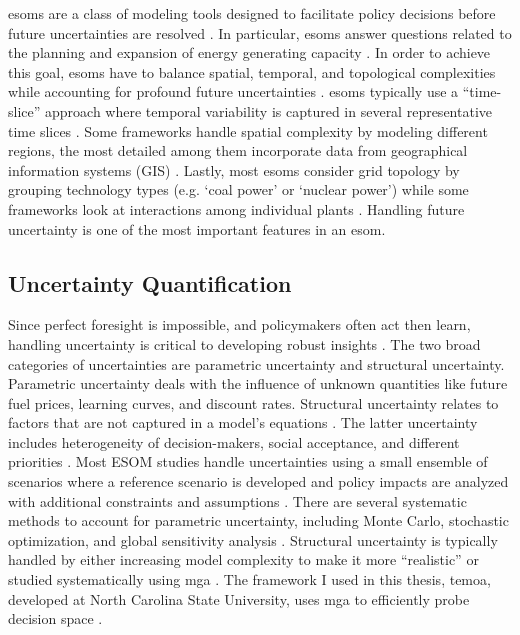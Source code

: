 \glspl{esom} are a class of modeling tools designed to facilitate policy decisions before
future uncertainties are resolved \cite{hunter_modeling_2013}. In particular, \glspl{esom} answer questions
related to the planning and expansion of energy generating capacity \cite{de_queiroz_repurposing_2019}.
In order to achieve this goal, \glspl{esom} have to balance spatial, temporal, and topological
complexities while accounting for profound future uncertainties \cite{martinez-gordon_review_2021}.
\glspl{esom} typically use a “time-slice” approach where temporal variability is captured in
several representative time slices \cite{fattahi_systemic_2020}. Some frameworks
handle spatial complexity by modeling different regions, the most detailed among
them incorporate data from geographical information systems (GIS) \cite{fattahi_systemic_2020}.
Lastly, most \glspl{esom} consider grid topology by grouping technology types (e.g. ‘coal power’
or ‘nuclear power’) \cite{fattahi_systemic_2020} while some frameworks look at
interactions among individual plants \cite{jenkins_enhanced_2017}. Handling
future uncertainty is one of the most important features in an \gls{esom}.

\subsection{Uncertainty Quantification}

Since perfect foresight is impossible, and policymakers often act then learn, handling
uncertainty is critical to developing robust insights
\cite{yue_review_2018, decarolis_modelling_2016}.
The two broad categories of uncertainties are parametric uncertainty and structural
uncertainty. Parametric uncertainty deals with the influence of unknown quantities
like future fuel prices, learning curves, and discount rates. Structural uncertainty
relates to factors that are not captured in a model’s equations
\cite{hunter_modeling_2013, yue_review_2018}.
The latter uncertainty includes heterogeneity of decision-makers,
social acceptance, and different priorities \cite{yue_review_2018}. Most ESOM
studies handle uncertainties using a small ensemble of scenarios where a reference
scenario is developed and policy impacts are analyzed with additional constraints
and assumptions \cite{yue_review_2018}. There are several systematic methods to
account for parametric uncertainty, including Monte Carlo, stochastic optimization,
and global sensitivity analysis \cite{yue_review_2018}. Structural uncertainty
is typically handled by either increasing model complexity to make it more
``realistic'' or studied systematically using \gls{mga}
\cite{hunter_modeling_2013,decarolis_modelling_2016, yue_review_2018}.
The framework I used in this thesis,
\gls{temoa}, developed at North Carolina State University, uses \gls{mga} to efficiently
probe decision space \cite{decarolis_temoa_2010}.


